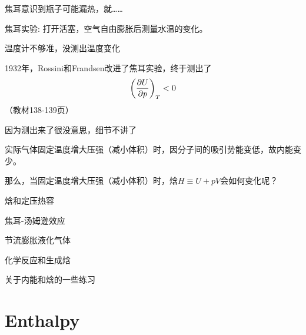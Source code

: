\documentclass[CJK]{beamer}
\begin{document}
\begin{frame}
\bch
焦耳意识到瓶子可能漏热，就……

焦耳实验: 打开活塞，空气自由膨胀后测量水温的变化。
\emini
{}
\emini

\ech
\end{frame}


\begin{frame}
\bch


温度计不够准，没测出温度变化 
\ech
\end{frame}


\begin{frame}
\bch
1932年，Rossini和Frandsen改进了焦耳实验，终于测出了
$$\left(\frac{\partial U}{\partial p}\right)_{T} < 0 $$
（教材138-139页）

因为测出来了很没意思，细节不讲了\bye
\ech
\end{frame}


\begin{frame}
\bch
实际气体固定温度增大压强（减小体积）时，因分子间的吸引势能变低，故内能变少。


那么，当固定温度增大压强（减小体积）时，焓$H\equiv U + pV$会如何变化呢？

\ech
\end{frame}


\begin{frame}
\bch
\bitem
\item{焓和定压热容}
\item{焦耳-汤姆逊效应}
\item{节流膨胀液化气体}
\item{化学反应和生成焓}
\item{关于内能和焓的一些练习}
\eitem
\ech
\end{frame}

\section{Enthalpy}

\begin{frame}
\bch


\ech
\end{frame}
\end{document}
